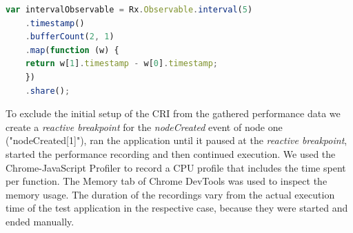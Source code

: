 	\begin{lstlisting}[language=JavaScript, caption={Example of RxJS code.},label={lst:performanceTestExtract}]
	var intervalObservable = Rx.Observable.interval(5)
	.timestamp()
	.bufferCount(2, 1)
	.map(function (w) {
	return w[1].timestamp - w[0].timestamp;
	})
	.share();	
	\end{lstlisting}

	To exclude the initial setup of the CRI from the gathered performance data we create a \emph{reactive breakpoint} for the \emph{nodeCreated} event of node one ("nodeCreated[1]"), ran the application until it paused at the \emph{reactive breakpoint}, started the performance recording and then continued execution. We used the Chrome-JavaScript Profiler to record a CPU profile that includes the time spent per function. The Memory tab of Chrome DevTools was used to inspect the memory usage. The duration of the recordings vary from the actual execution time of the test application in the respective case, because they were started and ended manually.\\
	
